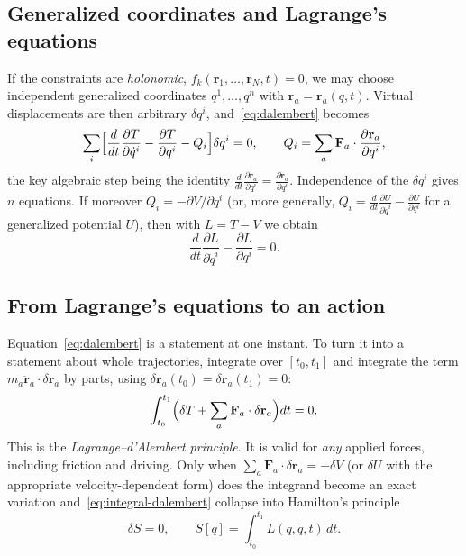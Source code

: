 \subsection{Generalized coordinates and Lagrange's equations}

If the constraints are \emph{holonomic}, $f_k(\mathbf r_1,\dots,\mathbf r_N,t)=0$,
we may choose independent generalized coordinates $q^1,\dots,q^n$ with
$\mathbf r_a=\mathbf r_a(q,t)$. Virtual displacements are then arbitrary
$\delta q^i$, and~\eqref{eq:dalembert} becomes
\begin{equation}
  \sum_i\Bigl[\frac{d}{dt}\frac{\partial T}{\partial\dot q^i}
  -\frac{\partial T}{\partial q^i}-Q_i\Bigr]\delta q^i=0,
  \qquad Q_i=\sum_a\mathbf F_a\cdot\frac{\partial\mathbf r_a}{\partial q^i},
  \label{eq:lagrange-T}
\end{equation}
the key algebraic step being the identity
$\frac{d}{dt}\frac{\partial\mathbf r_a}{\partial q^i}
=\frac{\partial\dot{\mathbf r}_a}{\partial q^i}$. Independence of the
$\delta q^i$ gives $n$ equations. If moreover $Q_i=-\partial V/\partial q^i$
(or, more generally, $Q_i=\frac{d}{dt}\frac{\partial U}{\partial\dot q^i}
-\frac{\partial U}{\partial q^i}$ for a generalized potential $U$), then with
$L=T-V$ we obtain
\begin{equation}
  \frac{d}{dt}\frac{\partial L}{\partial\dot q^i}-\frac{\partial L}{\partial q^i}=0 .
  \label{eq:EL}
\end{equation}

\subsection{From Lagrange's equations to an action}

Equation~\eqref{eq:dalembert} is a statement at one instant. To turn it into
a statement about whole trajectories, integrate over $[t_0,t_1]$ and integrate
the term $m_a\ddot{\mathbf r}_a\cdot\delta\mathbf r_a$ by parts, using
$\delta\mathbf r_a(t_0)=\delta\mathbf r_a(t_1)=0$:
\begin{equation}
  \int_{t_0}^{t_1}\Bigl(\delta T+\sum_a\mathbf F_a\cdot\delta\mathbf r_a\Bigr)dt=0 .
  \label{eq:integral-dalembert}
\end{equation}
This is the \emph{Lagrange--d'Alembert principle}. It is valid for \emph{any}
applied forces, including friction and driving. Only when
$\sum_a\mathbf F_a\cdot\delta\mathbf r_a=-\delta V$ (or $\delta U$ with the
appropriate velocity-dependent form) does the integrand become an exact
variation and~\eqref{eq:integral-dalembert} collapse into Hamilton's principle
\begin{equation}
  \delta S=0,\qquad S[q]=\int_{t_0}^{t_1}L(q,\dot q,t)\,dt .
  \label{eq:hamilton}
\end{equation}

